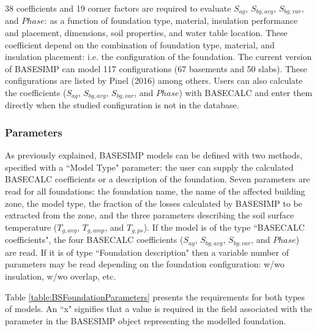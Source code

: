 38 coefficients and 19 corner factors are required to evaluate $S_{ag}$, $S_{bg,avg}$, $S_{bg,var}$, and $Phase$: as a function of foundation type, material, insulation performance and placement, dimensions, soil properties, and water table location.  These coefficient depend on the combination of foundation type, material, and insulation placement: i.e. the configuration of the foundation.  The current version of BASESIMP can model 117 configurations (67 basements and 50 slabs).  These configurations are listed by Pinel (2016) among others.  Users can also calculate the coefficients ($S_{ag}$, $S_{bg,avg}$, $S_{bg,var}$, and $Phase$) with BASECALC and enter them directly when the studied configuration is not in the database.

\subsubsection{Parameters}\label{parameters-basesimp}

As previously explained, BASESIMP models can be defined with two methods, specified with a ``Model Type" parameter: the user can supply the calculated BASECALC coefficients or a description of the foundation.  Seven parameters are read for all foundations: the foundation name, the name of the affected building zone, the model type, the fraction of the losses calculated by BASESIMP to be extracted from the zone, and the three parameters describing the soil surface temperature ($T_{g,avg}$, $T_{g,amp}$, and $T_{g,ps}$).  If the model is of the type ``BASECALC coefficients", the four BASECALC coefficients ($S_{ag}$, $S_{bg, avg}$, $S_{bg, var}$, and $Phase$) are read.  If it is of type ``Foundation description" then a variable number of parameters may be read depending on the foundation configuration: w/wo insulation, w/wo overlap, etc.

Table \ref{table:BSFoundationParameters} presents the requirements for both types of models.  An ``x" signifies that a value is required in the field associated with the parameter in the BASESIMP object representing the modelled foundation.

